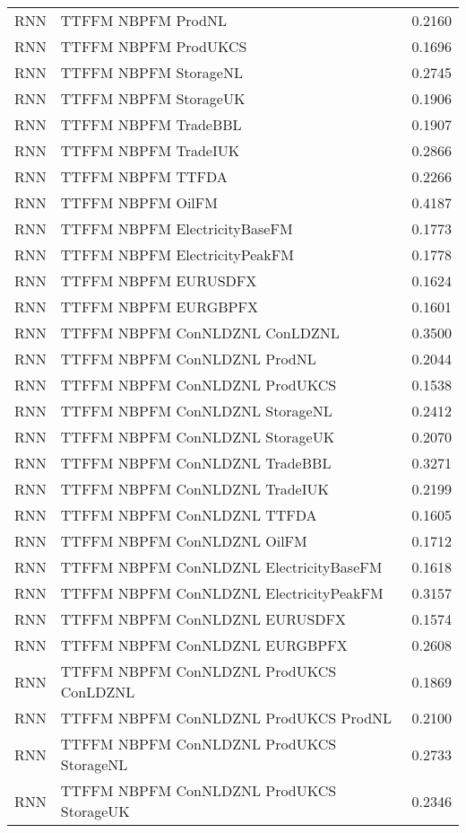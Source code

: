 \begin{table}[h!]
\begin{adjustbox}{max width=\textwidth}
\begin{tabular}{llr}
  RNN & TTFFM NBPFM ProdNL & 0.2160 \\ 
  RNN & TTFFM NBPFM ProdUKCS & 0.1696 \\ 
  RNN & TTFFM NBPFM StorageNL & 0.2745 \\ 
  RNN & TTFFM NBPFM StorageUK & 0.1906 \\ 
  RNN & TTFFM NBPFM TradeBBL & 0.1907 \\ 
  RNN & TTFFM NBPFM TradeIUK & 0.2866 \\ 
  RNN & TTFFM NBPFM TTFDA & 0.2266 \\ 
  RNN & TTFFM NBPFM OilFM & 0.4187 \\ 
  RNN & TTFFM NBPFM ElectricityBaseFM & 0.1773 \\ 
  RNN & TTFFM NBPFM ElectricityPeakFM & 0.1778 \\ 
  RNN & TTFFM NBPFM EURUSDFX & 0.1624 \\ 
  RNN & TTFFM NBPFM EURGBPFX & 0.1601 \\ 
  RNN & TTFFM NBPFM ConNLDZNL ConLDZNL & 0.3500 \\ 
  RNN & TTFFM NBPFM ConNLDZNL ProdNL & 0.2044 \\ 
  RNN & TTFFM NBPFM ConNLDZNL ProdUKCS & 0.1538 \\ 
  RNN & TTFFM NBPFM ConNLDZNL StorageNL & 0.2412 \\ 
  RNN & TTFFM NBPFM ConNLDZNL StorageUK & 0.2070 \\ 
  RNN & TTFFM NBPFM ConNLDZNL TradeBBL & 0.3271 \\ 
  RNN & TTFFM NBPFM ConNLDZNL TradeIUK & 0.2199 \\ 
  RNN & TTFFM NBPFM ConNLDZNL TTFDA & 0.1605 \\ 
  RNN & TTFFM NBPFM ConNLDZNL OilFM & 0.1712 \\ 
  RNN & TTFFM NBPFM ConNLDZNL ElectricityBaseFM & 0.1618 \\ 
  RNN & TTFFM NBPFM ConNLDZNL ElectricityPeakFM & 0.3157 \\ 
  RNN & TTFFM NBPFM ConNLDZNL EURUSDFX & 0.1574 \\ 
  RNN & TTFFM NBPFM ConNLDZNL EURGBPFX & 0.2608 \\ 
  RNN & TTFFM NBPFM ConNLDZNL ProdUKCS ConLDZNL & 0.1869 \\ 
  RNN & TTFFM NBPFM ConNLDZNL ProdUKCS ProdNL & 0.2100 \\ 
  RNN & TTFFM NBPFM ConNLDZNL ProdUKCS StorageNL & 0.2733 \\ 
  RNN & TTFFM NBPFM ConNLDZNL ProdUKCS StorageUK & 0.2346 \\ 

\end{tabular}
\end{adjustbox}
\end{table}
